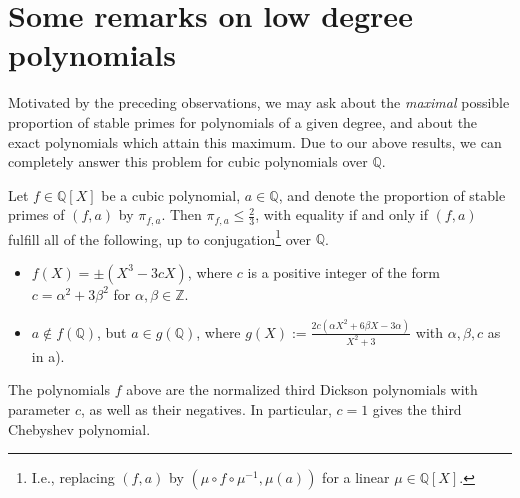 \documentclass[a4paper]{amsart}
\begin{document}
  

  \section{Some remarks on low degree polynomials} 
  \label{sec:lowdeg}
Motivated by the preceding observations, we may ask about the {\it maximal} possible proportion of stable primes for polynomials of a given degree, and about the exact polynomials which attain this maximum. Due to our above results, we can completely answer this problem for cubic polynomials over $\mathbb{Q}$.
  \begin{theorem}
  \label{thm:max}
  Let $f\in \mathbb{Q}[X]$ be a cubic polynomial, $a\in \mathbb{Q}$, and denote the proportion of stable primes of $(f,a)$ by $\pi_{f,a}$. Then $\pi_{f,a}\le \frac{2}{3}$, with equality if and only if $(f,a)$ fulfill all of the following, up to conjugation\footnote{I.e., replacing $(f,a)$ by $(\mu\circ f\circ \mu^{-1}, \mu(a))$ for a linear $\mu\in \mathbb{Q}[X]$.} over $\mathbb{Q}$.
  \begin{itemize}
  \item[a)] $f(X) = \pm (X^3-3cX)$, where $c$ is a positive integer of the form $c=\alpha^2+3\beta^2$ for $\alpha,\beta\in \mathbb{Z}$.
  \item[b)] $a\notin f(\mathbb{Q})$, but $a\in g(\mathbb{Q})$, where %
  $g(X):=\frac{2c(\alpha X^2+6\beta X-3\alpha)}{X^2+3}$ with $\alpha,\beta, c$ as in a).
  \end{itemize}
  \end{theorem}
  \begin{remark}
  The polynomials $f$ above are the normalized third Dickson polynomials with parameter $c$, as well as their negatives. In particular, $c=1$ gives the third Chebyshev polynomial.
  \end{remark}
\end{document}
